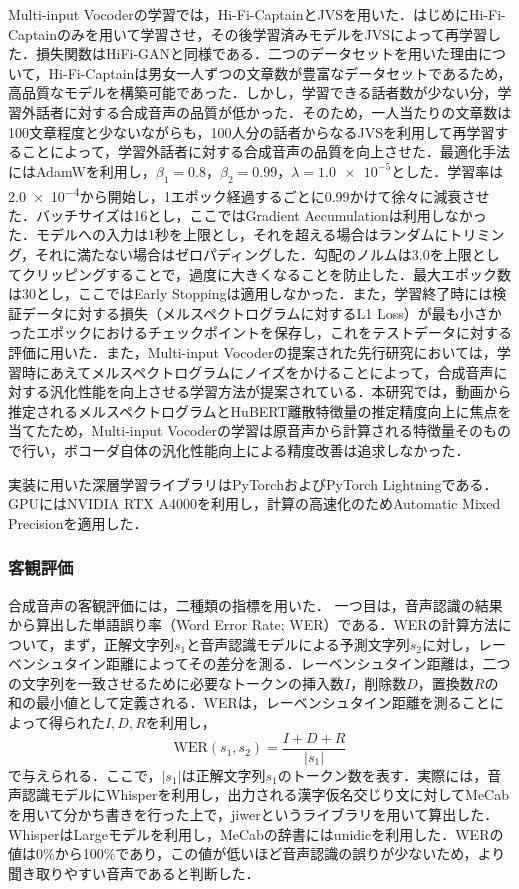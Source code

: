 \documentclass[12pt]{jarticle}
\numberwithin{equation}{section}    %
\numberwithin{figure}{section}      %
\numberwithin{table}{section}      %
\begin{document}
Multi-input Vocoderの学習では，Hi-Fi-CaptainとJVSを用いた．はじめにHi-Fi-Captainのみを用いて学習させ，その後学習済みモデルをJVSによって再学習した．損失関数はHiFi-GANと同様である．二つのデータセットを用いた理由について，Hi-Fi-Captainは男女一人ずつの文章数が豊富なデータセットであるため，高品質なモデルを構築可能であった．しかし，学習できる話者数が少ない分，学習外話者に対する合成音声の品質が低かった．そのため，一人当たりの文章数は100文章程度と少ないながらも，100人分の話者からなるJVSを利用して再学習することによって，学習外話者に対する合成音声の品質を向上させた．最適化手法にはAdamWを利用し，$\beta_{1} = 0.8$，$\beta_{2} = 0.99$，$\lambda = \num{1.0e-5}$とした．学習率は\num{2.0e-4}から開始し，1エポック経過するごとに0.99かけて徐々に減衰させた．バッチサイズは16とし，ここではGradient Accumulationは利用しなかった．モデルへの入力は1秒を上限とし，それを超える場合はランダムにトリミング，それに満たない場合はゼロパディングした．勾配のノルムは3.0を上限としてクリッピングすることで，過度に大きくなることを防止した．最大エポック数は30とし，ここではEarly Stoppingは適用しなかった．また，学習終了時には検証データに対する損失（メルスペクトログラムに対するL1 Loss）が最も小さかったエポックにおけるチェックポイントを保存し，これをテストデータに対する評価に用いた．また，Multi-input Vocoderの提案された先行研究\cite{choi2023intelligible}においては，学習時にあえてメルスペクトログラムにノイズをかけることによって，合成音声に対する汎化性能を向上させる学習方法が提案されている．本研究では，動画から推定されるメルスペクトログラムとHuBERT離散特徴量の推定精度向上に焦点を当てたため，Multi-input Vocoderの学習は原音声から計算される特徴量そのもので行い，ボコーダ自体の汎化性能向上による精度改善は追求しなかった．

実装に用いた深層学習ライブラリはPyTorchおよびPyTorch Lightningである．GPUにはNVIDIA RTX A4000を利用し，計算の高速化のためAutomatic Mixed Precisionを適用した．

\subsubsection{客観評価}
合成音声の客観評価には，二種類の指標を用いた．
一つ目は，音声認識の結果から算出した単語誤り率（Word Error Rate; WER）である．WERの計算方法について，まず，正解文字列$s_{1}$と音声認識モデルによる予測文字列$s_{2}$に対し，レーベンシュタイン距離によってその差分を測る．レーベンシュタイン距離は，二つの文字列を一致させるために必要なトークンの挿入数$I$，削除数$D$，置換数$R$の和の最小値として定義される．WERは，レーベンシュタイン距離を測ることによって得られた$I, D, R$を利用し，
\begin{equation}
    \text{WER}(s_{1}, s_{2}) = \frac{I + D + R}{|s_{1}|}
\end{equation}
で与えられる．ここで，$|s_{1}|$は正解文字列$s_{1}$のトークン数を表す．実際には，音声認識モデルにWhisper\cite{radford2023robust}を利用し，出力される漢字仮名交じり文に対してMeCabを用いて分かち書きを行った上で，jiwerというライブラリを用いて算出した．WhisperはLargeモデルを利用し，MeCabの辞書にはunidicを利用した．WERの値は0\%から100\%であり，この値が低いほど音声認識の誤りが少ないため，より聞き取りやすい音声であると判断した．
\end{document}
